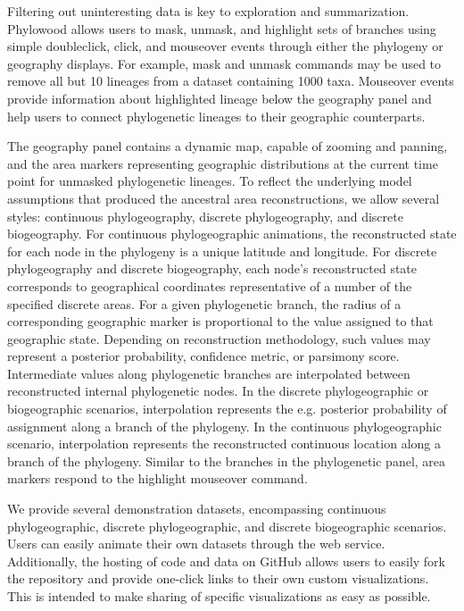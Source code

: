 \documentclass[11pt]{article}
\begin{document}
Filtering out uninteresting data is key to exploration and summarization. Phylowood allows users to mask, unmask, and highlight sets of branches using simple doubleclick, click, and mouseover events through either the phylogeny or geography displays. For example, mask and unmask commands may be used to remove all but 10 lineages from a dataset containing 1000 taxa. Mouseover events provide information about highlighted lineage below the geography panel and help users to connect phylogenetic lineages to their geographic counterparts.

The geography panel contains a dynamic map, capable of zooming and panning, and the area markers representing geographic distributions at the current time point for unmasked phylogenetic lineages. To reflect the underlying model assumptions that produced the ancestral area reconstructions, we allow several styles: continuous phylogeography, discrete phylogeography, and discrete biogeography. For continuous phylogeographic animations, the reconstructed state for each node in the phylogeny is a unique latitude and longitude. For discrete phylogeography and discrete biogeography, each node's reconstructed state corresponds to geographical coordinates representative of a number of the specified discrete areas. For a given phylogenetic branch, the radius of a corresponding geographic marker is proportional to the value assigned to that geographic state. Depending on reconstruction methodology, such values may represent a posterior probability, confidence metric, or parsimony score. Intermediate values along phylogenetic branches are interpolated between reconstructed internal phylogenetic nodes. In the discrete phylogeographic or biogeographic scenarios, interpolation represents the e.g. posterior probability of assignment along a branch of the phylogeny. In the continuous phylogeographic scenario, interpolation represents the reconstructed continuous location along a branch of the phylogeny. Similar to the branches in the phylogenetic panel, area markers respond to the highlight mouseover command.

We provide several demonstration datasets, encompassing continuous phylogeographic, discrete phylogeographic, and discrete biogeographic scenarios. Users can easily animate their own datasets through the web service. Additionally, the hosting of code and data on GitHub allows users to easily fork the repository and provide one-click links to their own custom visualizations. This is intended to make sharing of specific visualizations as easy as possible.
\end{document}
